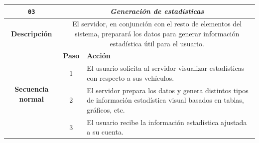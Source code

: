 \begin{table}[H]
  \centering
  \begin{tabularx}{\textwidth}{|c|c|X|}
    \hline
    \texttt{03}                                & \multicolumn{2}{c|}{\textit{Generación de estadísticas}}                                                                                                                                                                                                                                                                \\
    \hline
    \textbf{Descripción}                       & \multicolumn{2}{X|}{El servidor, en conjunción con el resto de elementos del sistema, preparará los datos para generar información estadística útil para el usuario.}                                                                                                                                                   \\
    \hline
    \multirow{4}{*}{\textbf{Secuencia normal}} & \textbf{Paso}                                                                                                                                                         & \textbf{Acción}                                                                                                                                 \\
    \cline{2-3}
                                               & 1                                                                                                                                                                     & \multicolumn{1}{L|}{El usuario solicita al servidor visualizar estadísticas con respecto a sus vehículos.}                                      \\
    \cline{2-3}
                                               & 2                                                                                                                                                                     & \multicolumn{1}{L|}{El servidor prepara los datos y genera distintos tipos de información estadística visual basados en tablas, gráficos, etc.} \\
    \cline{2-3}
                                               & 3                                                                                                                                                                     & \multicolumn{1}{L|}{El usuario recibe la información estadística ajustada a su cuenta.}                                                         \\

\end{tabularx}
\end{table}
